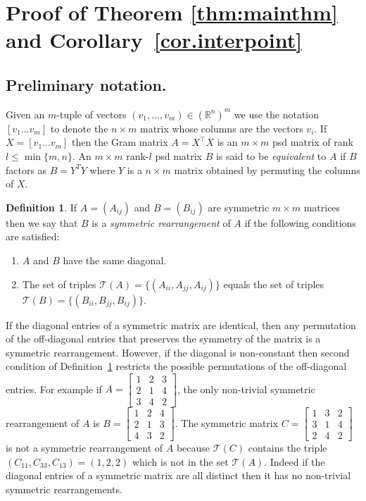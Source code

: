 \documentclass{article}
\theoremstyle{definition}
\newtheorem{Definition}{Definition}
\renewcommand{\r}{\mathbb{R}}
\renewcommand{\|}{|}
\begin{document}
\section{Proof of Theorem \ref{thm:mainthm} and Corollary~\ref{cor.interpoint}}



\subsection{Preliminary notation.} 

 Given an $m$-tuple of vectors $(v_1, \ldots  , v_m)\in (\r^{n})^m$ we use the notation $[v_1 \ldots v_m]$ to denote
the $n \times m$ matrix whose columns are the vectors $v_i$. If $X = [v_1 \ldots v_m]$ then the Gram matrix
$A=X^\top X$ is an $m \times m$ psd matrix of rank $l \leq \min\{m,n\}$. An $m \times m$ rank-$l$ psd matrix $B$ is said to be {\em equivalent} to $A$ if $B$ factors as $B = Y^TY$ where $Y$ is a $n \times m$ matrix obtained by permuting the columns of $X$.

\begin{Definition}\label{def.symmrearrangement}
   If $A= (A_{ij})$ and $B=(B_{ij})$ are symmetric $m \times m$ matrices then we say that $B$ is a 
{\em symmetric rearrangement} of $A$ if the following conditions are satisfied:
\begin{enumerate}
    \item $A$ and $B$ have the same diagonal.
    \item The set of triples $\mathcal{T}(A) = \{(A_{ii}, A_{jj}, A_{ij})\}$ equals the set of triples
    $\mathcal{T}(B) = \{(B_{ii}, B_{jj}, B_{ij})\}$.
\end{enumerate}
\end{Definition}


If  the diagonal entries of a symmetric matrix are identical, then any permutation of the off-diagonal entries that preserves the symmetry of
the matrix is a symmetric rearrangement. However, if the diagonal is non-constant then second condition of Definition~\ref{def.symmrearrangement} restricts the possible permutations of the off-diagonal entries. For 
example if $A = \begin{bmatrix} 1 & 2 & 3\\ 2 & 1 & 4 \\ 3 & 4 & 2\end{bmatrix}$,  
the only non-trivial symmetric rearrangement of $A$ is $B = \begin{bmatrix} 1 & 2 & 4\\2 & 1 & 3\\ 4 & 3 & 2\end{bmatrix}$.
The symmetric matrix $C = \begin{bmatrix} 1 & 3 & 2\\ 3 & 1 & 4\\2 & 4 & 2\end{bmatrix}$ is not a symmetric rearrangement
of $A$ because $\mathcal{T}(C)$ contains the triple $(C_{11}, C_{33}, C_{13}) = (1,2,2)$ which is not in the set
$\mathcal{T}(A)$. Indeed if the diagonal entries of a symmetric matrix are all distinct then it has no non-trivial symmetric rearrangements.
\end{document}
